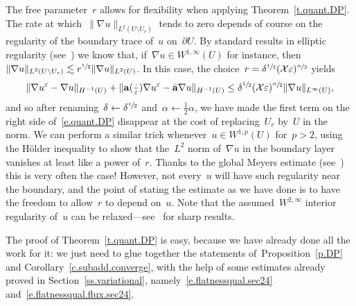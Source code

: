 \documentclass[11pt]{article} %
\numberwithin{equation}{section}
\theoremstyle{definition}
\newcommand{\eps}{\varepsilon}
\newcommand{\ep}{\eps}
\renewcommand{\a}{\mathbf{a}}
\newcommand{\ahom}{\bar{\a}}
\newcommand{\X}{\mathcal{X}}
\begin{document}
The free parameter~$r$ allows for flexibility when applying Theorem~\ref{t.quant.DP}. The rate at which~$\| \nabla u \|_{{L}^2(U \setminus U_r)}$ tends to zero depends of course on the regularity of the boundary trace of~$u$ on~$\partial U$. By standard results in elliptic regularity (see~\cite[Proposition B.16]{AKMBook}) we know that, if~$\nabla u \in W^{1,\infty}(U)$  for instance, then~$\| \nabla u \|_{{L}^2(U \setminus U_r)} \lesssim r^{\sfrac12}\| \nabla u \|_{{L}^2(U)}$. In this case, the choice~$r = \delta^{\sfrac12} (\X \ep)^{\sfrac \alpha2}$ yields 
\begin{equation*}
\| \nabla u^\ep - \nabla u \|_{H^{-1}(U)} 
+ 
\| \a(\tfrac \cdot \ep) \nabla u^\ep - \ahom \nabla u \|_{H^{-1}(U)} 
\leq
\delta^{\sfrac12} 
(\X \ep)^{\sfrac \alpha 2}
\| \nabla u \|_{L^\infty(U)} ,
\end{equation*}
and so after renaming~$\delta \leftarrow \delta^{\sfrac12}$ and~$\alpha \leftarrow \frac12\alpha$, we have made the first term on the right side of~\eqref{e.quant.DP} disappear at the cost of replacing~$U_r$ by~$U$ in the norm. 
We can perform a similar trick whenever~$u \in W^{1,p}(U)$ for~$p>2$, using the H\"older inequality to show that the~$L^2$ norm of~$\nabla u$ in the boundary layer vanishes at least like a power of~$r$. Thanks to the global Meyers estimate (see~\cite[Appendix C]{AKMBook}) this is very often the case! However, not every~$u$ will have such regularity near the boundary, and the point of stating the estimate as we have done is to have the freedom to allow~$r$ to depend on~$u$. 
Note that the assumed~$W^{2,\infty}$ interior regularity of~$u$ can be relaxed---see~\cite[Section 6.3]{AKMBook} for sharp results. 


\smallskip

The proof of Theorem~\ref{t.quant.DP} is easy, because we have already done all the work for it: we just need to glue together the statements of~Proposition~\ref{p.DP} and Corollary~\ref{c.subadd.converge}, with the help of some estimates already proved in Section~\ref{ss.variational}, namely~\eqref{e.flatnessqual.sec24} and~\eqref{e.flatnessqual.flux.sec24}.
\end{document}
